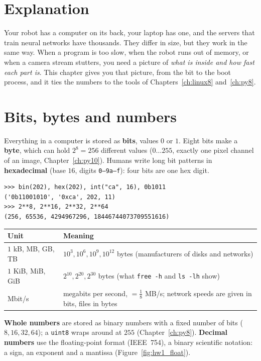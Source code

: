 \label{ch:hw1}

\section*{Explanation}
Your robot has a computer on its back, your laptop has one, and the servers that train neural networks have thousands. They differ in size, but they work in the same way. When a program is too slow, when the robot runs out of memory, or when a camera stream stutters, you need a picture of \emph{what is inside and how fast each part is}. This chapter gives you that picture, from the bit to the boot process, and it ties the numbers to the tools of Chapters~\ref{ch:linux8} and~\ref{ch:py8}.

\section*{Bits, bytes and numbers}
Everything in a computer is stored as \textbf{bits}, values $0$ or $1$. Eight bits make a \textbf{byte}, which can hold $2^8=256$ different values ($0\dots255$, exactly one pixel channel of an image, Chapter~\ref{ch:py10}). Humans write long bit patterns in \textbf{hexadecimal} (base $16$, digits \texttt{0--9a--f}): four bits are one hex digit.
\begin{verbatim}
>>> bin(202), hex(202), int("ca", 16), 0b1011
('0b11001010', '0xca', 202, 11)
>>> 2**8, 2**16, 2**32, 2**64
(256, 65536, 4294967296, 18446744073709551616)
\end{verbatim}
\begin{center}
\renewcommand{\arraystretch}{1.2}
\begin{tabular}{p{3.6cm}p{9.4cm}}
\textbf{Unit} & \textbf{Meaning}\\ \hline
$1$ kB, MB, GB, TB & $10^3,10^6,10^9,10^{12}$ bytes (manufacturers of disks and networks)\\
$1$ KiB, MiB, GiB & $2^{10}, 2^{20}, 2^{30}$ bytes (what \texttt{free -h} and \texttt{ls -lh} show)\\
Mbit/s & megabits per second, $=\tfrac18$ MB/s; network speeds are given in bits, files in bytes\\
\end{tabular}
\end{center}
\textbf{Whole numbers} are stored as binary numbers with a fixed number of bits ($8,16,32,64$); a \texttt{uint8} wraps around at $255$ (Chapter~\ref{ch:py8}). \textbf{Decimal numbers} use the floating-point format (IEEE~754), a binary scientific notation: a sign, an exponent and a mantissa (Figure~\ref{fig:hw1_float}).
